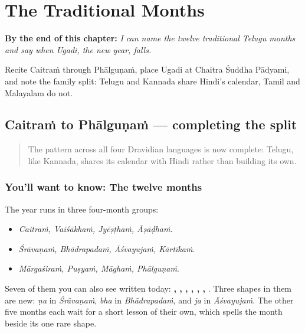 
\chapter{The Traditional Months}
\label{ch:te-traditional-months}

\begin{chapteropening}
\textbf{By the end of this chapter:} \emph{I can name the twelve traditional Telugu months and say when Ugadi, the new year, falls.}

Recite Caitraṁ through Phālguṇaṁ, place Ugadi at Chaitra Śuddha Pādyami, and note the family split: Telugu and Kannada share Hindi's calendar, Tamil and Malayalam do not.
\end{chapteropening}

\section[\texorpdfstring{\te{చైత్రం} \te{వైశాఖం} \te{జ్యేష్ఠం} … (Caitraṁ …)}{చైత్రం వైశాఖం జ్యేష్ఠం … (Caitraṁ …)}]{Caitraṁ to Phālguṇaṁ — completing the split}

\label{lesson:TE-C16-nelalu}



\begin{quote}
The pattern across all four Dravidian languages is now complete: Telugu, like Kannada, shares its calendar with Hindi rather than building its own.
\end{quote}

\subsection*{You'll want to know: The twelve months}
The year runs in three four-month groups:

\begin{itemize}
\raggedright
  \item \emph{Caitraṁ, Vaiśākhaṁ, Jyēṣṭhaṁ, Āṣāḍhaṁ}.
  \item \emph{Śrāvaṇaṁ, Bhādrapadaṁ, Āśvayujaṁ, Kārtīkaṁ}.
  \item \emph{Mārgaśiraṁ, Puṣyaṁ, Māghaṁ, Phālguṇaṁ}.
\end{itemize}

Seven of them you can also see written today: \textbf{, , , , , , }. Three shapes in them are new: \textbf{} \emph{ṇa} in \emph{Śrāvaṇaṁ}, \textbf{} \emph{bha} in \emph{Bhādrapadaṁ}, and \textbf{} \emph{ja} in \emph{Āśvayujaṁ}. The other five months each wait for a short lesson of their own, which spells the month beside its one rare shape.

